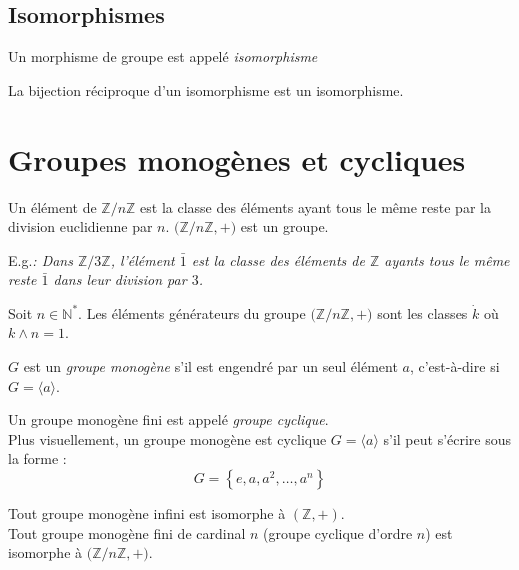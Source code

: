 \documentclass[11pt,a4paper,fleqn,pdftex]{report}
\begin{document}
\subsection{Isomorphismes} %
\label{sub:isomorphismes}
\begin{dfn}[Isomorphisme]
     Un morphisme de groupe  est appelé \emph{isomorphisme}
\end{dfn}
\begin{theorem}
     La bijection réciproque d'un isomorphisme est un isomorphisme.
\end{theorem}
\section{Groupes monogènes et cycliques} %
\label{sec:groupes_monogenes_et_cycliques}
\begin{dfn}
Un élément de $\mathbb{Z}/ n\mathbb{Z}$ est la classe des éléments ayant tous le même reste par la division euclidienne par $n$.\newline
$\big( \mathbb{Z}/n\mathbb{Z},+ \big)$ est un groupe.
\end{dfn}
E.g.\textit{: Dans $\mathbb{Z}/3\mathbb{Z}$, l'élément $\bar{1}$ est la classe des éléments de $\mathbb{Z}$ ayants tous le même reste $\bar{1}$ dans leur division par $3$.}
\begin{theorem}
     Soit $n\in \mathbb{N}^*$. Les éléments générateurs du groupe $\big( \mathbb{Z}/n\mathbb{Z},+ \big)$ sont les classes $\dot{k}$ où $k \wedge n = 1$.
\end{theorem}
\begin{dfn}
     $G$ est un \emph{groupe monogène} s'il est engendré par un seul élément $a$, c'est-à-dire si $G = \langle a \rangle$.
\end{dfn}
\begin{dfn}
     Un groupe monogène fini est appelé \emph{groupe cyclique}.\\
     Plus visuellement, un groupe monogène est cyclique $G = \langle a \rangle$ s'il peut s'écrire sous la forme : 
     \[G = \left\lbrace e,a,a^2,\ldots,a^n \right\rbrace \]
\end{dfn}
\begin{itheorem}
     Tout groupe monogène infini est isomorphe à $(\mathbb{Z},+)$.\\
     Tout groupe monogène fini de cardinal $n$ (groupe cyclique d'ordre $n$) est isomorphe à $\big(\mathbb{Z}/n\mathbb{Z},+\big)$.
\end{itheorem}
\end{document}
